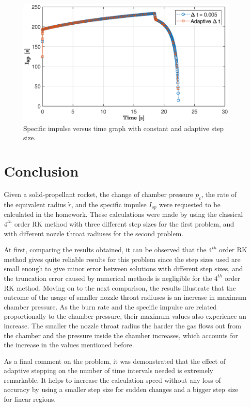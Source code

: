 \documentclass[letterpaper,12pt]{article}
\begin{document}
\begin{figure}[!h]
	\centering
	\includegraphics[height = 8.5 cm]{graphs/bonus_isp.eps}
	\caption{Specific impulse versus time graph with constant and adaptive step size.}
	\label{fig:bonus_isp}
\end{figure}

\newpage

\section{Conclusion}

Given a solid-propellant rocket, the change of chamber pressure $p_c$,
the rate of the equivalent radius $\dot{r}$, and the specific impulse $I_{sp}$ were
requested to be calculated in the homework. These calculations were
made by using the classical $4^{th}$ order RK method with three different step sizes for the first
problem, and with different nozzle throat radiuses for the second problem.

At first, comparing the results obtained, it can be observed that the $4^{th}$ order RK method gives
quite reliable results for this problem since the step sizes used are small
enough to give minor error between solutions with different step sizes, and the truncation error
caused by numerical methods is negligible for the $4^{th}$ order RK method. Moving on to the
next comparison, the results illustrate that the outcome of the usage of smaller nozzle throat
radiuses is an increase in maximum chamber pressure. As the burn rate and the specific impulse
are related proportionally to the chamber pressure, their maximum values also experience
an increase. The smaller the nozzle throat radius the harder the gas flows out from the chamber and
the pressure inside the chamber increases, which accounts for the increase in the values
mentioned before.

As a final comment on the problem, it was demonstrated that the effect of adaptive stepping
on the number of time intervals needed is extremely remarkable. It helps to increase
the calculation speed without any loss of accuracy by using a smaller step size for
sudden changes and a bigger step size for linear regions.
\end{document}
